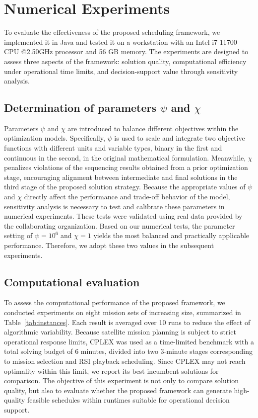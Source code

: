 \documentclass[preprint,3p,12pt,authoryear]{elsarticle}
\begin{document}
\section{Numerical Experiments}
To evaluate the effectiveness of the proposed scheduling framework, we implemented it in Java and tested it on a workstation with an Intel i7-11700 CPU @2.50GHz processor and 56 GB memory. The experiments are designed to assess three aspects of the framework: solution quality, computational efficiency under operational time limits, and decision-support value through sensitivity analysis.

\subsection{Determination of parameters $\psi$ and $\chi$} \label{senpsichi}
Parameters $\psi$ and $\chi$ are introduced to balance different objectives within the optimization models. Specifically, $\psi$ is used to scale and integrate two objective functions with different units and variable types, binary in the first and continuous in the second, in the original mathematical formulation. Meanwhile, $\chi$ penalizes violations of the sequencing results obtained from a prior optimization stage, encouraging alignment between intermediate and final solutions in the third stage of the proposed solution strategy. Because the appropriate values of $\psi$ and $\chi$ directly affect the performance and trade-off behavior of the model, sensitivity analysis is necessary to test and calibrate these parameters in numerical experiments. These tests were validated using real data provided by the collaborating organization. Based on our numerical tests, the parameter setting of $\psi=10^6$ and $\chi=1$ yields the most balanced and practically applicable performance. Therefore, we adopt these two values in the subsequent experiments.

\subsection{Computational evaluation}
To assess the computational performance of the proposed framework, we conducted experiments on eight mission sets of increasing size, summarized in Table~\ref{tab:instances}. Each result is averaged over 10 runs to reduce the effect of algorithmic variability. Because satellite mission planning is subject to strict operational response limits, CPLEX was used as a time-limited benchmark with a total solving budget of 6 minutes, divided into two 3-minute stages corresponding to mission selection and RSI playback scheduling. Since CPLEX may not reach optimality within this limit, we report its best incumbent solutions for comparison. The objective of this experiment is not only to compare solution quality, but also to evaluate whether the proposed framework can generate high-quality feasible schedules within runtimes suitable for operational decision support.
\end{document}

